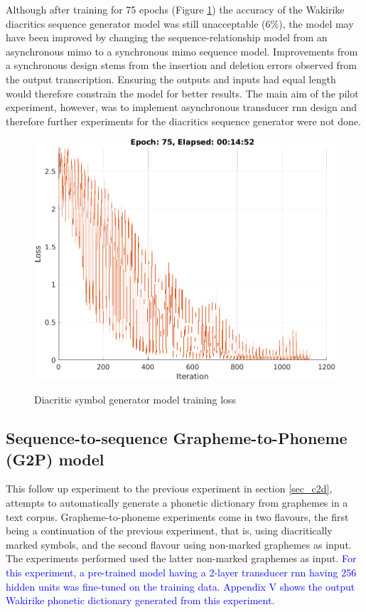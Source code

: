 Although after training for 75 epochs (Figure \ref{fig_c3_t2d00}) the accuracy of the Wakirike diacritics sequence generator model was still unacceptable (6\%), the model may have been improved by changing the sequence-relationship model from an asynchronous \acrshort{mimo} to a synchronous \acrshort{mimo} sequence model.  Improvements from a synchronous design stems from the insertion and deletion errors observed from the output transcription.  Ensuring the outputs and inputs had equal length would therefore constrain the model for better results.  The main aim of the pilot experiment, however, was to implement asynchronous transducer \acrshort{rnn} design and therefore further experiments for the diacritics sequence generator were not done.
\stopblue
\begin{figure}
\centering
  \includegraphics[width=14cm]{thesis/images/dtrain.png}\\
  \caption{Diacritic symbol generator model training loss}\label{fig_c3_t2d00}
\end{figure}

\subsection{Sequence-to-sequence Grapheme-to-Phoneme (G2P) model}\label{sec_c3_g2p}
This follow up experiment to the previous experiment in section \ref{sec_c2d},  attempts to automatically generate a phonetic dictionary from graphemes in a text corpus. Grapheme-to-phoneme experiments come in two flavours, the first being a continuation of the previous experiment, that is, using diacritically marked symbols, and the second flavour using non-marked graphemes as input.  The experiments performed used the latter non-marked graphemes as input.  \textcolor{blue}{For this experiment, a pre-trained model having a 2-layer transducer \acrshort{rnn} having 256 hidden units was fine-tuned on the training data.  Appendix V shows the output Wakirike phonetic dictionary generated from this experiment.}

